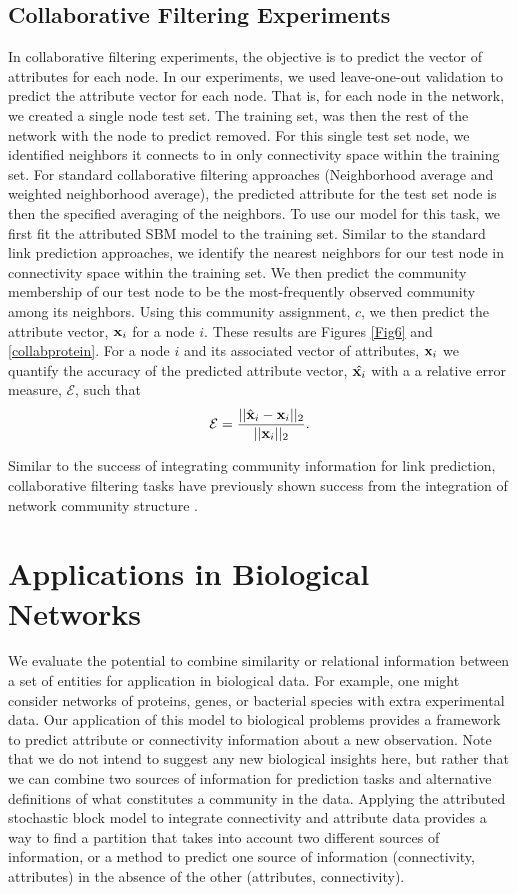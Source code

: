 \subsection{Collaborative Filtering Experiments}
In collaborative filtering experiments, the objective is to predict the vector of attributes for each node. In our experiments, we used leave-one-out validation to predict the attribute vector for each node. That is, for each node in the network, we created a single node test set. The training set, was then the rest of the network with the node to predict removed. For this single test set node, we identified neighbors it connects to in only connectivity space within the training set. For standard collaborative filtering approaches (Neighborhood average and weighted neighborhood average), the predicted attribute for the test set node is then the specified averaging of the neighbors. To use our model for this task, we first fit the attributed SBM model to the training set. Similar to the standard link prediction approaches, we identify the nearest neighbors for our test node in connectivity space within the training set. We then predict the community membership of our test node to be the most-frequently observed community among its neighbors. Using this community assignment, $c$, we then predict the attribute vector, ${\bf x}_{i}$ for a node $i$. These results are Figures \ref{Fig6} and \ref{collabprotein}. For a node $i$ and its associated vector of attributes, ${\bf x}_{i}$ we quantify the accuracy of the predicted attribute vector, $\hat{{\bf x}_{i}}$ with a a relative error measure, $\mathcal{E}$, such that 
\begin{equation}
\mathcal{E}=\frac{||\hat{\bf{x}}_{i}-{\bf x}_{i}||_{2}}{||{\bf x}_{i}||_{2}}.
\end{equation}

Similar to the success of integrating community information for link prediction, collaborative filtering tasks have previously shown success from the integration of network community structure \cite{collabComm}. 

\section{Applications in Biological Networks}
We evaluate the potential to combine similarity or relational information between a set of entities for application in biological data. For example, one might consider networks of proteins, genes, or bacterial species with extra experimental data. Our application of this model to biological problems provides a framework to predict attribute or connectivity information about a new observation.  Note that we do not intend to suggest any new biological insights here, but rather that we can combine two sources of information for prediction tasks and alternative definitions of what constitutes a community in the data. Applying the attributed stochastic block model to integrate connectivity and attribute data provides a way to find a partition that takes into account two different sources of information, or a method to predict one source of information (connectivity, attributes) in the absence of the other (attributes, connectivity). 

